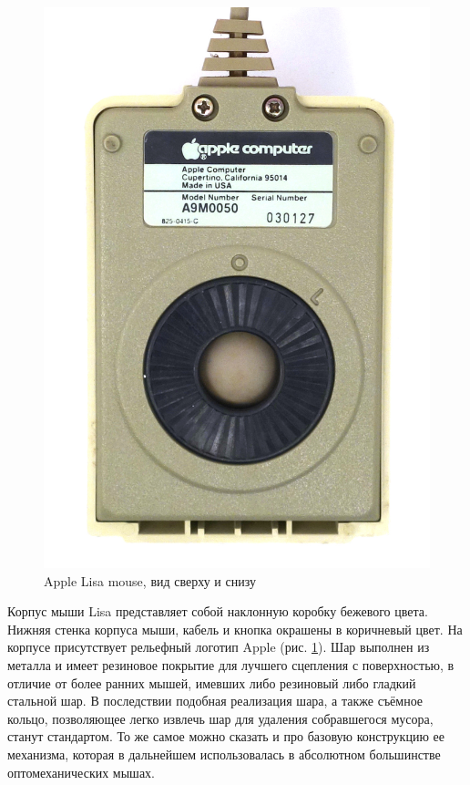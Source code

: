 \documentclass[11pt, a4paper]{article}
\begin{document}
\begin{figure}[h]
    \includegraphics[scale=0.7]{1983_apple_lisa_mouse/applebottom_60.jpg}
    \caption{Apple Lisa mouse, вид сверху и снизу}
    \label{fig:AppleLisaTopAndBottom}
\end{figure}

Корпус мыши Lisa представляет собой наклонную коробку бежевого цвета. Нижняя стенка корпуса мыши, кабель и кнопка окрашены в коричневый цвет. На корпусе присутствует рельефный логотип Apple (рис. \ref{fig:AppleLisaTopAndBottom}). Шар выполнен из металла и имеет резиновое покрытие для лучшего сцепления с поверхностью, в отличие от более ранних мышей, имевших либо резиновый либо гладкий стальной шар. В последствии подобная реализация шара, а также съёмное кольцо, позволяющее легко извлечь шар для удаления собравшегося мусора, станут стандартом. То же самое можно сказать и про базовую конструкцию ее механизма, которая в дальнейшем использовалась в абсолютном большинстве оптомеханических мышах.
\end{document}
